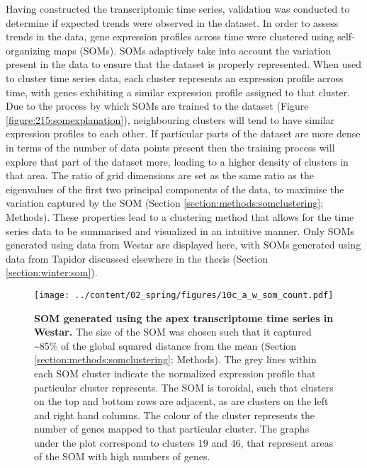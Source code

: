 \documentclass[12pt,]{book}
\begin{document}
Having constructed the transcriptomic time series, validation was
conducted to determine if expected trends were observed in the dataset.
In order to assess trends in the data, gene expression profiles across
time were clustered using self-organizing maps (SOMs). SOMs adaptively
take into account the variation present in the data to ensure that the
dataset is properly represented. When used to cluster time series data,
each cluster represents an expression profile across time, with genes
exhibiting a similar expression profile assigned to that cluster. Due to
the process by which SOMs are trained to the dataset (Figure
\ref{figure:215:somexplanation}), neighbouring clusters will tend to
have similar expression profiles to each other. If particular parts of
the dataset are more dense in terms of the number of data points present
then the training process will explore that part of the dataset more,
leading to a higher density of clusters in that area. The ratio of grid
dimensions are set as the same ratio as the eigenvalues of the first two
principal components of the data, to maximise the variation captured by
the SOM (Section \ref{section:methods:somclustering}; Methods). These
properties lead to a clustering method that allows for the time series
data to be summarised and visualized in an intuitive manner. Only SOMs
generated using data from Westar are displayed here, with SOMs generated
using data from Tapidor discussed elsewhere in the thesis (Section
\ref{section:winter:som}).

\begin{figure}[htbp]
\centering
\texttt{[image: ../content/02\_spring/figures/10c\_a\_w\_som\_count.pdf]}
\caption{\textbf{SOM generated using the apex transcriptome time series
in Westar.} The size of the SOM was chosen such that it captured
\textasciitilde{}85\% of the global squared distance from the mean
(Section \ref{section:methods:somclustering}; Methods). The grey lines
within each SOM cluster indicate the normalized expression profile that
particular cluster represents. The SOM is toroidal, such that clusters
on the top and bottom rows are adjacent, as are clusters on the left and
right hand columns. The colour of the cluster represents the number of
genes mapped to that particular cluster. The graphs under the plot
correspond to clusters 19 and 46, that represent areas of the SOM with
high numbers of genes.}\label{figure:216:somaw}
\end{figure}
\end{document}
